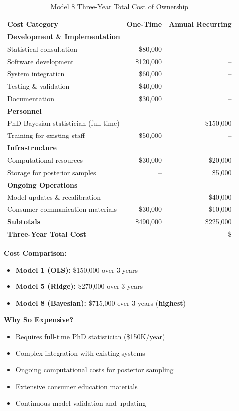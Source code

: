 \begin{table}[h]
\centering
\caption{Model 8 Three-Year Total Cost of Ownership}
\begin{tabular}{lrr}
\toprule
\textbf{Cost Category} & \textbf{One-Time} & \textbf{Annual Recurring} \\
\midrule
\textbf{Development \& Implementation} & & \\
Statistical consultation & \$80,000 & -- \\
Software development & \$120,000 & -- \\
System integration & \$60,000 & -- \\
Testing \& validation & \$40,000 & -- \\
Documentation & \$30,000 & -- \\
\midrule
\textbf{Personnel} & & \\
PhD Bayesian statistician (full-time) & -- & \$150,000 \\
Training for existing staff & \$50,000 & -- \\
\midrule
\textbf{Infrastructure} & & \\
Computational resources & \$30,000 & \$20,000 \\
Storage for posterior samples & -- & \$5,000 \\
\midrule
\textbf{Ongoing Operations} & & \\
Model updates \& recalibration & -- & \$40,000 \\
Consumer communication materials & \$30,000 & \$10,000 \\
\midrule
\textbf{Subtotals} & \$490,000 & \$225,000 \\
\midrule
\textbf{Three-Year Total Cost} & \multicolumn{2}{r}{\$\ModelEightThreeYearTCO{}} \\
\bottomrule
\end{tabular}
\end{table}

\textbf{Cost Comparison:}
\begin{itemize}
    \item \textbf{Model 1 (OLS):} \$150,000 over 3 years
    \item \textbf{Model 5 (Ridge):} \$270,000 over 3 years
    \item \textbf{Model 8 (Bayesian):} \$715,000 over 3 years (\textbf{highest})
\end{itemize}

\textbf{Why So Expensive?}
\begin{itemize}
    \item Requires full-time PhD statistician (\$150K/year)
    \item Complex integration with existing systems
    \item Ongoing computational costs for posterior sampling
    \item Extensive consumer education materials
    \item Continuous model validation and updating
\end{itemize}

